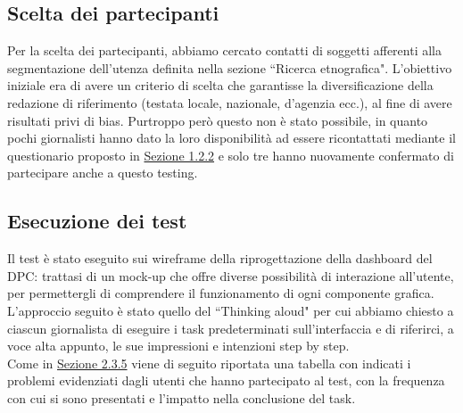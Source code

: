 \subsection{Scelta dei partecipanti}
\label{ss:scelta-partecipanti}
Per la scelta dei partecipanti, abbiamo cercato contatti di soggetti afferenti alla segmentazione dell'utenza definita nella sezione ``Ricerca etnografica". L'obiettivo iniziale era di avere un criterio di scelta che garantisse la diversificazione della redazione di riferimento (testata locale, nazionale, d'agenzia ecc.), al fine di avere risultati privi di bias.
Purtroppo però questo non è stato possibile, in quanto pochi giornalisti hanno dato la loro disponibilità ad essere ricontattati mediante il questionario proposto in \hyperref[ss:questionario-online]{Sezione 1.2.2} e solo tre hanno nuovamente confermato di partecipare anche a questo testing.

\subsection{Esecuzione dei test}
\label{ss:esecuzione-test}
Il test è stato eseguito sui wireframe della riprogettazione della dashboard del DPC: trattasi di un mock-up che offre diverse possibilità di interazione all'utente, per permettergli di comprendere il funzionamento di ogni componente grafica.\\
L'approccio seguito è stato quello del ``Thinking aloud" per cui abbiamo chiesto a ciascun giornalista di eseguire i task predeterminati sull'interfaccia e di riferirci, a voce alta appunto, le sue impressioni e intenzioni step by step.\\
Come in \hyperref[sss:approccio-adottato]{Sezione 2.3.5} viene di seguito riportata una tabella con indicati i problemi evidenziati dagli utenti che hanno partecipato al test, con la frequenza con cui si sono presentati e l'impatto nella conclusione del task.

